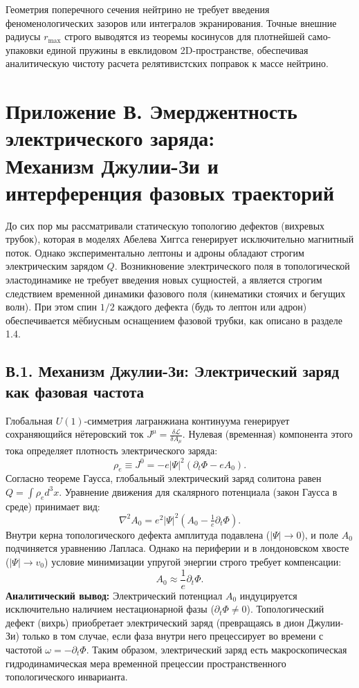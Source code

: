\documentclass[11pt,a4paper]{article}
\begin{document}
	Геометрия поперечного сечения нейтрино не требует введения феноменологических зазоров или интегралов экранирования. Точные внешние радиусы $r_{\text{max}}$ строго выводятся из теоремы косинусов для плотнейшей само-упаковки единой пружины в евклидовом 2D-пространстве, обеспечивая аналитическую чистоту расчета релятивистских поправок к массе нейтрино.

\section*{Приложение В. Эмерджентность электрического заряда:\\ Механизм Джулии-Зи и интерференция фазовых траекторий}

До сих пор мы рассматривали статическую топологию дефектов (вихревых трубок), которая в моделях Абелева Хиггса генерирует исключительно магнитный поток. Однако экспериментально лептоны и адроны обладают строгим электрическим зарядом $Q$. Возникновение электрического поля в топологической эластодинамике не требует введения новых сущностей, а является строгим следствием временной динамики фазового поля (кинематики стоячих и бегущих волн). При этом спин $1/2$ каждого дефекта (будь то лептон или адрон) обеспечивается мёбиусным оснащением фазовой трубки, как описано в разделе 1.4.

\subsection*{В.1. Механизм Джулии-Зи: Электрический заряд как фазовая частота}
Глобальная $U(1)$-симметрия лагранжиана континуума генерирует сохраняющийся нётеровский ток $J^\mu = \frac{\delta \mathcal{L}}{\delta A_\mu}$. Нулевая (временная) компонента этого тока определяет плотность электрического заряда:
\begin{equation}
	\rho_e \equiv J^0 = -e |\Psi|^2 (\partial_t \Phi - e A_0).
\end{equation}
Согласно теореме Гаусса, глобальный электрический заряд солитона равен $Q = \int \rho_e d^3x$. Уравнение движения для скалярного потенциала (закон Гаусса в среде) принимает вид:
\begin{equation}
	\nabla^2 A_0 = e^2 |\Psi|^2 (A_0 - \tfrac{1}{e}\partial_t \Phi).
\end{equation}
Внутри керна топологического дефекта амплитуда подавлена ($|\Psi| \to 0$), и поле $A_0$ подчиняется уравнению Лапласа. Однако на периферии и в лондоновском хвосте ($|\Psi| \to v_0$) условие минимизации упругой энергии строго требует компенсации:
\begin{equation}
	A_0 \approx \frac{1}{e} \partial_t \Phi.
\end{equation}
\textbf{Аналитический вывод:} Электрический потенциал $A_0$ индуцируется исключительно наличием нестационарной фазы ($\partial_t \Phi \neq 0$). Топологический дефект (вихрь) приобретает электрический заряд (превращаясь в дион Джулии-Зи) только в том случае, если фаза внутри него прецессирует во времени с частотой $\omega = -\partial_t \Phi$. Таким образом, электрический заряд есть макроскопическая гидродинамическая мера временной прецессии пространственного топологического инварианта.
\end{document}

